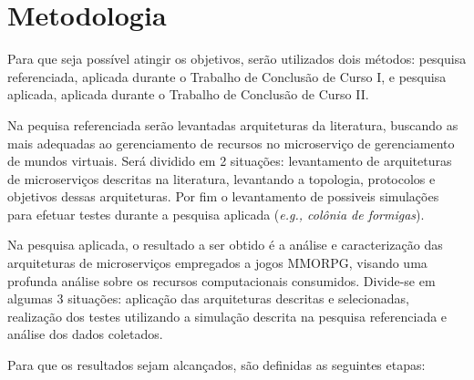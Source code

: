 \section{Metodologia}
\label{met}

Para que seja poss\'{i}vel atingir os objetivos, serão utilizados dois métodos: pesquisa referenciada, aplicada durante o Trabalho de Conclusão de Curso I, e pesquisa aplicada, aplicada durante o Trabalho de Conclusão de Curso II.

Na pequisa referenciada serão levantadas arquiteturas da literatura, buscando as mais adequadas ao gerenciamento de recursos no microserviço de gerenciamento de mundos virtuais. Será dividido em 2 situações: levantamento de arquiteturas de microserviços descritas na literatura, levantando a topologia, protocolos e objetivos dessas arquiteturas. Por fim o levantamento de possiveis simulações para efetuar testes durante a pesquisa aplicada (\textit{e.g., colônia de formigas}).

Na pesquisa aplicada, o resultado a ser obtido é a análise e caracterização das arquiteturas de microserviços empregados a jogos MMORPG, visando uma profunda análise sobre os recursos computacionais consumidos. Divide-se em algumas 3 situações: aplicação das arquiteturas descritas e selecionadas, realização dos testes utilizando a simulação descrita na pesquisa referenciada e análise dos dados coletados.

Para que os resultados sejam alcançados, são definidas as seguintes etapas:


